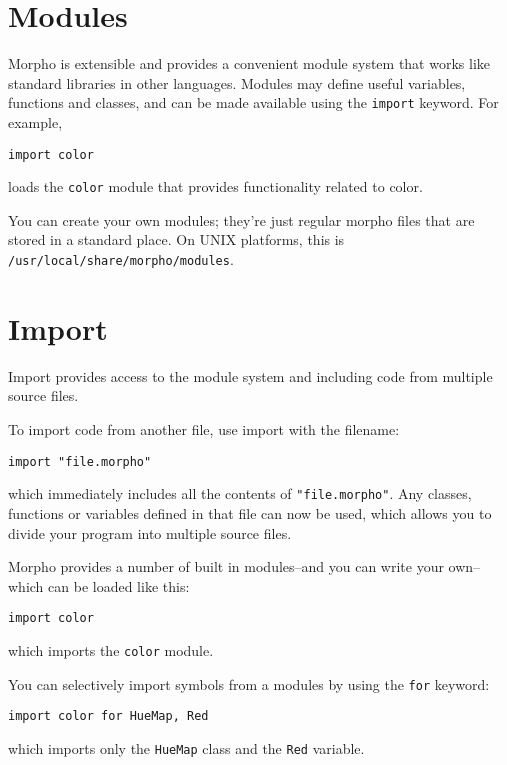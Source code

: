\hypertarget{modules}{%
\section{Modules}\label{modules}}

Morpho is extensible and provides a convenient module system that works
like standard libraries in other languages. Modules may define useful
variables, functions and classes, and can be made available using the
\texttt{import} keyword. For example,

\begin{lstlisting}
import color
\end{lstlisting}

loads the \texttt{color} module that provides functionality related to
color.

You can create your own modules; they're just regular morpho files that
are stored in a standard place. On UNIX platforms, this is
\texttt{/usr/local/share/morpho/modules}.

\hypertarget{import}{%
\section{Import}\label{import}}

Import provides access to the module system and including code from
multiple source files.

To import code from another file, use import with the filename:

\begin{lstlisting}
import "file.morpho"
\end{lstlisting}

which immediately includes all the contents of \texttt{"file.morpho"}.
Any classes, functions or variables defined in that file can now be
used, which allows you to divide your program into multiple source
files.

Morpho provides a number of built in modules--and you can write your
own--which can be loaded like this:

\begin{lstlisting}
import color
\end{lstlisting}

which imports the \texttt{color} module.

You can selectively import symbols from a modules by using the
\texttt{for} keyword:

\begin{lstlisting}
import color for HueMap, Red
\end{lstlisting}

which imports only the \texttt{HueMap} class and the \texttt{Red}
variable.
